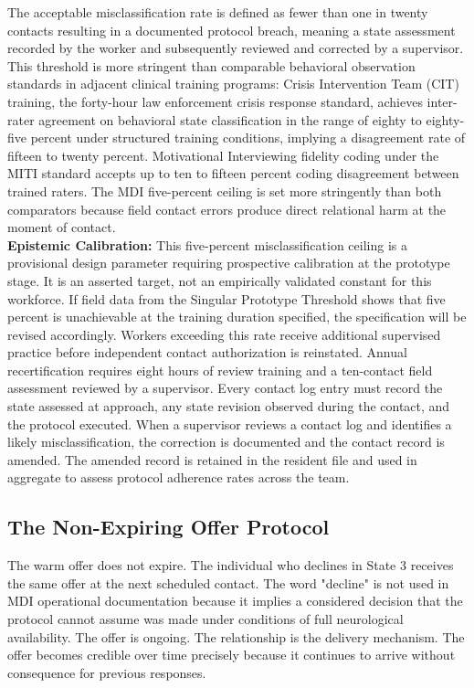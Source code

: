 \documentclass[12pt, letterpaper]{article}
\begin{document}
The acceptable misclassification rate is defined as fewer than one in twenty contacts resulting in a documented protocol breach, meaning a state assessment recorded by the worker and subsequently reviewed and corrected by a supervisor. This threshold is more stringent than comparable behavioral observation standards in adjacent clinical training programs: Crisis Intervention Team (CIT) training, the forty-hour law enforcement crisis response standard, achieves inter-rater agreement on behavioral state classification in the range of eighty to eighty-five percent under structured training conditions, implying a disagreement rate of fifteen to twenty percent. Motivational Interviewing fidelity coding under the MITI standard accepts up to ten to fifteen percent coding disagreement between trained raters. The MDI five-percent ceiling is set more stringently than both comparators because field contact errors produce direct relational harm at the moment of contact.\\
\textbf{Epistemic Calibration:} This five-percent misclassification ceiling is a provisional design parameter requiring prospective calibration at the prototype stage. It is an asserted target, not an empirically validated constant for this workforce. If field data from the Singular Prototype Threshold shows that five percent is unachievable at the training duration specified, the specification will be revised accordingly. Workers exceeding this rate receive additional supervised practice before independent contact authorization is reinstated. Annual recertification requires eight hours of review training and a ten-contact field assessment reviewed by a supervisor. Every contact log entry must record the state assessed at approach, any state revision observed during the contact, and the protocol executed. When a supervisor reviews a contact log and identifies a likely misclassification, the correction is documented and the contact record is amended. The amended record is retained in the resident file and used in aggregate to assess protocol adherence rates across the team.

\subsection{The Non-Expiring Offer Protocol}

The warm offer does not expire. The individual who declines in State 3 receives the same offer at the next scheduled contact. The word "decline" is not used in MDI operational documentation because it implies a considered decision that the protocol cannot assume was made under conditions of full neurological availability. The offer is ongoing. The relationship is the delivery mechanism. The offer becomes credible over time precisely because it continues to arrive without consequence for previous responses.
\end{document}

